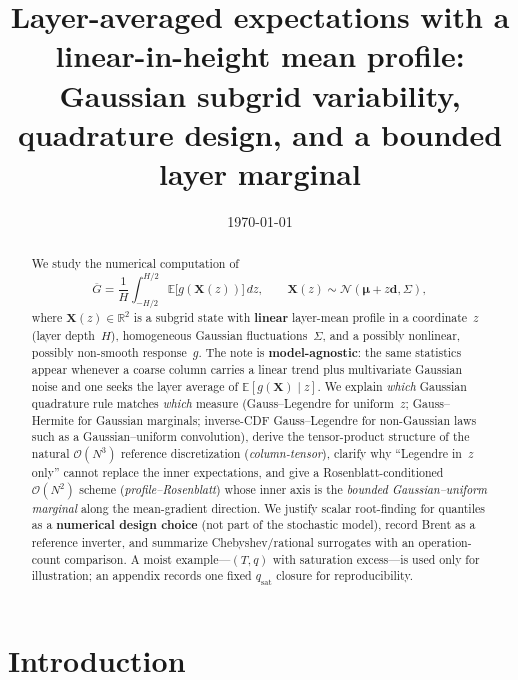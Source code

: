 \documentclass[11pt,a4paper]{article}
\title{\textbf{Layer-averaged expectations with a linear-in-height mean profile:\\
Gaussian subgrid variability, quadrature design, and a bounded layer marginal}}
\author{}
\date{\today}
\begin{document}
\newcommand{\centeronly}{\emph{center-only}}
\newcommand{\momentmatched}{\emph{moment-matched}}
\newcommand{\columntensor}{\emph{column-tensor}}
\newcommand{\profileros}{\emph{profile--Rosenblatt}}
\maketitle

\begin{abstract}
We study the numerical computation of
\[
  \overline{G}=\frac{1}{H}\int_{-H/2}^{H/2}\mathbb{E}\bigl[g(\mathbf{X}(z))\bigr]\,dz,
  \qquad
  \mathbf{X}(z)\sim\mathcal{N}(\boldsymbol{\mu}+z\mathbf{d},\Sigma),
\]
where $\mathbf{X}(z)\in\mathbb{R}^2$ is a subgrid state with \textbf{linear} layer-mean profile in a coordinate~$z$ (layer depth~$H$), homogeneous Gaussian fluctuations~$\Sigma$, and a possibly nonlinear, possibly non-smooth response~$g$.
The note is \textbf{model-agnostic}: the same statistics appear whenever a coarse column carries a linear trend plus multivariate Gaussian noise and one seeks the layer average of $\mathbb{E}[g(\mathbf{X})\mid z]$.
We explain \emph{which} Gaussian quadrature rule matches \emph{which} measure (Gauss--Legendre for uniform~$z$; Gauss--Hermite for Gaussian marginals; inverse-CDF Gauss--Legendre for non-Gaussian laws such as a Gaussian--uniform convolution), derive the tensor-product structure of the natural $\mathcal{O}(N^3)$ reference discretization (\columntensor), clarify why ``Legendre in~$z$ only'' cannot replace the inner expectations, and give a Rosenblatt-conditioned $\mathcal{O}(N^2)$ scheme (\profileros) whose inner axis is the \emph{bounded Gaussian--uniform marginal} along the mean-gradient direction.
We justify scalar root-finding for quantiles as a \textbf{numerical design choice} (not part of the stochastic model), record Brent as a reference inverter, and summarize Chebyshev/rational surrogates with an operation-count comparison.
A moist example---$(T,q)$ with saturation excess---is used only for illustration; an appendix records one fixed $q_{\mathrm{sat}}$ closure for reproducibility.
\end{abstract}

\tableofcontents
\newpage

\section{Introduction}
\label{sec:intro}
\end{document}
